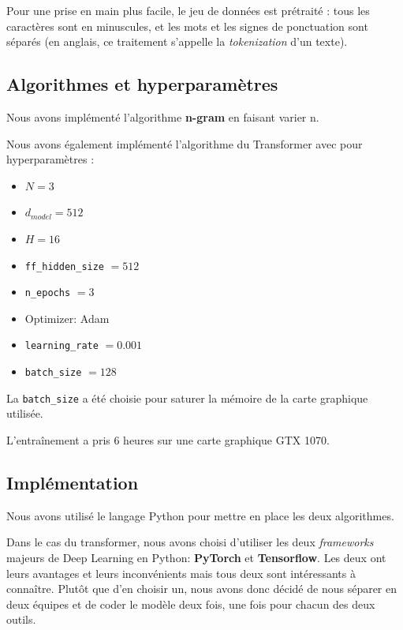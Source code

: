 Pour une prise en main plus facile, le jeu de données est prétraité :
tous les caractères sont en minuscules, et les mots et les signes de
ponctuation sont séparés (en anglais, ce traitement s'appelle la
\emph{tokenization} d'un texte).

\hypertarget{algorithmes-et-hyperparamuxe8tres}{%
\subsection{Algorithmes et
hyperparamètres}\label{algorithmes-et-hyperparamuxe8tres}}

Nous avons implémenté l'algorithme \textbf{n-gram} en faisant varier n.

Nous avons également implémenté l'algorithme du Transformer avec pour
hyperparamètres :

\begin{itemize}
\item
  \(N = 3\)
\item
  \(d_{model} = 512\)
\item
  \(H = 16\)
\item
  \texttt{ff\_hidden\_size} $ = 512$
\item
  \texttt{n\_epochs} $ = 3$
\item
  Optimizer: Adam
\item
  \texttt{learning\_rate} $ = 0.001 $
\item
  \texttt{batch\_size} $ = 128$
\end{itemize}

La \texttt{batch\_size} a été choisie pour saturer la mémoire de la
carte graphique utilisée.

L'entraînement a pris 6 heures sur une carte graphique GTX 1070.

\hypertarget{impluxe9mentation}{%
\subsection{Implémentation}\label{impluxe9mentation}}

Nous avons utilisé le langage Python pour mettre en place les deux
algorithmes.

Dans le cas du transformer, nous avons choisi d'utiliser les deux
\emph{frameworks} majeurs de Deep Learning en Python: \textbf{PyTorch}
et \textbf{Tensorflow}. Les deux ont leurs avantages et leurs inconvénients 
mais tous deux sont intéressants à connaître. Plutôt que d’en choisir un, 
nous avons donc décidé de nous séparer en deux équipes et de coder le 
modèle deux fois, une fois pour chacun des deux outils.

